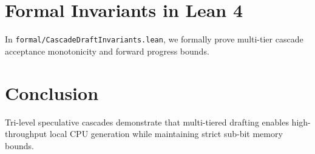 \documentclass[10pt,twocolumn,letterpaper]{article}
\begin{document}
\section{Formal Invariants in Lean 4}
In \texttt{formal/CascadeDraftInvariants.lean}, we formally prove multi-tier cascade acceptance monotonicity and forward progress bounds.

\section{Conclusion}
Tri-level speculative cascades demonstrate that multi-tiered drafting enables high-throughput local CPU generation while maintaining strict sub-bit memory bounds.
\end{document}
